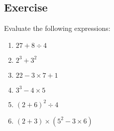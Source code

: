 \subsection{Exercise}
Evaluate the following expressions:
\begin{enumerate}
	\item $27 + 8 \div 4$
	\item $2^3 + 3^2$
	\item $22 - 3 \times 7 + 1$
	\item $3^3 - 4 \times 5$
	\item $(2+6)^2 \div 4$
	\item $(2 + 3) \times (5^2 - 3 \times 6)$
\end{enumerate}
